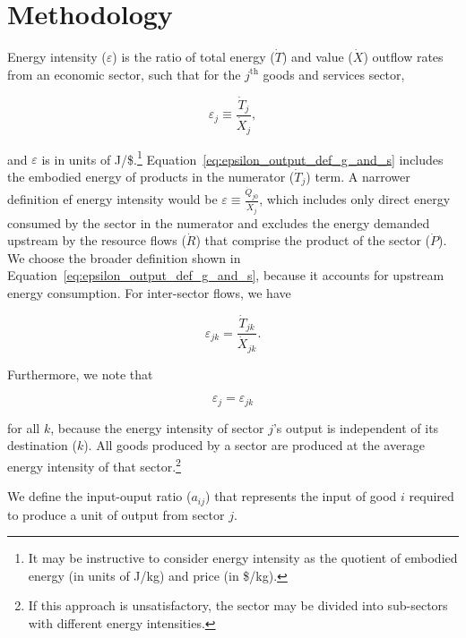 \section{Methodology}

Energy intensity ($\varepsilon$)
is the ratio 
of total energy ($\dot{T}$) 
and value ($\dot{X}$) outflow rates 
from an economic sector, 
such that for the $j^{\mathrm{th}}$ goods and services sector,

\begin{equation} \label{eq:epsilon_output_def_g_and_s}
	\varepsilon_{j} \equiv \frac{\dot{T}_{j}}{\dot{X}_{j}},
\end{equation} 

\noindent{}and $\varepsilon$ is in units of J/\$.\footnote{It may be
instructive to consider energy intensity as the quotient
of embodied energy (in units of J/kg) and price (in \$/kg).}
Equation~\ref{eq:epsilon_output_def_g_and_s}
includes the embodied energy of products in the numerator ($\dot{T}_{j}$) term. 
A narrower definition ef energy intensity would be 
$\varepsilon \equiv \frac{\dot{Q}_{j0}}{\dot{X}_{j}}$,
which includes only direct energy consumed by the sector
in the numerator
and excludes the energy demanded upstream by the 
resource flows ($\dot{R}$) that comprise the product of the sector ($\dot{P}$).
We choose the broader definition shown in
Equation~\ref{eq:epsilon_output_def_g_and_s},
because it accounts for upstream energy consumption.
For inter-sector flows, we have

\begin{equation} \label{eq:epsilon_transfers_1}
	\varepsilon_{jk} = \frac{\dot{T}_{jk}}{\dot{X}_{jk}}.
\end{equation}

\noindent{}Furthermore, we note that 

\begin{equation} \label{eq:epsilon_equiv_1}
	\varepsilon_{j} = \varepsilon_{jk}
\end{equation}

\noindent{}for all $k$, because the energy intensity 
of sector $j$'s output is independent of its destination ($k$). 
All goods produced by a sector 
are produced at the average energy intensity 
of that sector.\footnote{If this approach is unsatisfactory, 
the sector may be divided into sub-sectors 
with different energy intensities.}

We define the input-ouput ratio ($a_{ij}$)
that represents the input 
of good $i$ required to produce a unit of output from sector $j$.

